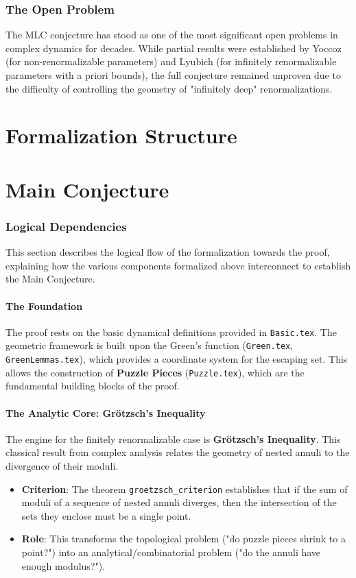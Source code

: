 \documentclass[reqno]{amsart}
\begin{document}
\section{The Open Problem}

The MLC conjecture has stood as one of the most significant open problems in complex dynamics for decades. While partial results were established by Yoccoz (for non-renormalizable parameters) and Lyubich (for infinitely renormalizable parameters with a priori bounds), the full conjecture remained unproven due to the difficulty of controlling the geometry of "infinitely deep" renormalizations.

\part*{Formalization Structure}

\part*{Main Conjecture}

\section{Logical Dependencies}

This section describes the logical flow of the formalization towards the proof, explaining how the various components formalized above interconnect to establish the Main Conjecture.

\subsection{The Foundation}
The proof rests on the basic dynamical definitions provided in \texttt{Basic.tex}. The geometric framework is built upon the Green's function (\texttt{Green.tex}, \texttt{GreenLemmas.tex}), which provides a coordinate system for the escaping set. This allows the construction of \textbf{Puzzle Pieces} (\texttt{Puzzle.tex}), which are the fundamental building blocks of the proof.

\subsection{The Analytic Core: Grötzsch's Inequality}
The engine for the finitely renormalizable case is \textbf{Grötzsch's Inequality}. This classical result from complex analysis relates the geometry of nested annuli to the divergence of their moduli.
\begin{itemize}
    \item \textbf{Criterion}: The theorem \texttt{groetzsch\_criterion} establishes that if the sum of moduli of a sequence of nested annuli diverges, then the intersection of the sets they enclose must be a single point.
    \item \textbf{Role}: This transforms the topological problem ("do puzzle pieces shrink to a point?") into an analytical/combinatorial problem ("do the annuli have enough modulus?").
\end{itemize}
\end{document}
